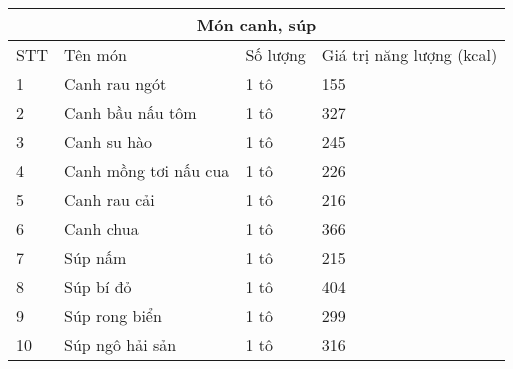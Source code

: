 \begin{center}
\begin{tabular}{ | m{1cm} | m{4cm}| m{3cm} | m{4cm}|}
 \hline
 \multicolumn{4}{|c|}{Món canh, súp} \\
 \hline
  STT& Tên món & Số lượng & Giá trị năng lượng (kcal) \\ 
\hline
  1 & Canh rau ngót & 1 tô & 155 \\ 
 \hline
  2 & Canh bầu nấu tôm & 1 tô & 327\\ 
 \hline
   3& Canh su hào & 1 tô & 245 \\ 
 \hline
   4 & Canh mồng tơi nấu cua & 1 tô & 226 \\ 
 \hline
   5 & Canh rau cải & 1 tô & 216 \\ 
 \hline
   6 & Canh chua & 1 tô & 366 \\ 
 \hline
   7 & Súp nấm & 1 tô & 215 \\ 
 \hline
    8 & Súp bí đỏ & 1 tô & 404 \\ 
 \hline
    9 & Súp rong biển & 1 tô & 299 \\ 
 \hline
    10 & Súp ngô hải sản & 1 tô & 316 \\ 
 \hline
\end{tabular}
\end{center}



